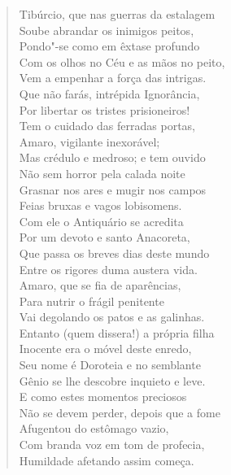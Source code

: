 \begin{verse}

Tibúrcio, que nas guerras da estalagem\\
Soube abrandar os inimigos peitos,\\
Pondo"-se como em êxtase profundo\\
Com os olhos no Céu e as mãos no peito,\\
Vem a empenhar a força das intrigas.\\
Que não farás, intrépida Ignorância,\\			\index{\Ignor}
Por libertar os tristes prisioneiros! \\[10pt]


Tem o cuidado das ferradas portas,\\
Amaro, vigilante inexorável;\\
Mas crédulo e medroso; e tem ouvido\\
Não sem horror pela calada noite\\
Grasnar nos ares e mugir nos campos\\
Feias bruxas e vagos lobisomens.\\
Com ele o Antiquário se acredita\\
Por um devoto e santo Anacoreta,\\		\index{\Anac}
Que passa os breves dias deste mundo\\
Entre os rigores duma austera vida.\\
Amaro, que se fia de aparências,\\
Para nutrir o frágil penitente\\
Vai degolando os patos e as galinhas.\\
Entanto (quem dissera!) a própria filha\\
Inocente era o móvel deste enredo,\\
Seu nome é Doroteia e no semblante\\
Gênio se lhe descobre inquieto e leve.\\
E como estes momentos preciosos\\
Não se devem perder, depois que a fome\\
Afugentou do estômago vazio,\\
Com branda voz em tom de profecia,\\
Humildade afetando assim começa. \\[10pt]



\end{verse}
